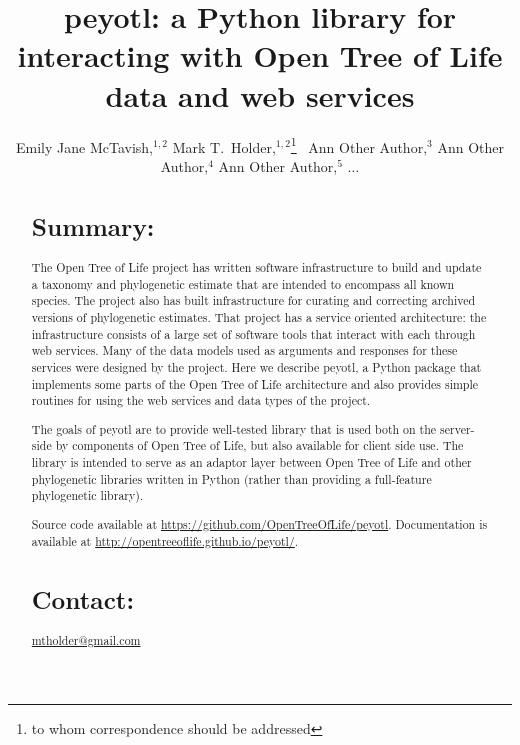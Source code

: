 \documentclass{bioinfo}
\newcommand{\pey}{peyotl\xspace}
\newcommand{\otol}{Open Tree of Life\xspace}
\begin{document}
\title[peyotl python package]{peyotl: a Python library for interacting with Open Tree of Life data and web services}

\author[McTavish\textit{et~al}]{
    Emily Jane McTavish,$^{1,2}$
    Mark T.~Holder,$^{1,2}$\footnote{to whom correspondence should be addressed}~
    Ann Other Author,$^{3}$
    Ann Other Author,$^{4}$
    Ann Other Author,$^{5}$ $\ldots$
}
\address{$^{1}$Department of Ecology and Evolutionary Biology, University of Kansas, Lawrence KS, USA\\
$^{2}$Heidelberg Institute of Theoretical Studies, Heidelberg, Germany}



\maketitle

\begin{abstract}
\section{Summary:}
The Open Tree of Life project has written software infrastructure
to build and update a taxonomy and phylogenetic estimate that 
are intended to encompass all known species.
The project also has built infrastructure for curating and correcting
    archived versions of phylogenetic estimates.
That project has a service oriented architecture: the infrastructure consists of
    a large set of software tools that interact with each through web services.
Many of the data models used as arguments and responses for these services were designed
    by the project.
Here we describe \pey, a Python package that implements some parts of
    the \otol architecture and also provides simple routines for 
    using the web services and data types of the project.

The goals of \pey are to provide well-tested library that is used
    both on the server-side by components of \otol, but also
    available for client side use.
The library is intended to serve as an adaptor layer between \otol
    and other phylogenetic libraries written in Python (rather 
    than providing a full-feature phylogenetic library).

Source code available at \url{https://github.com/OpenTreeOfLife/peyotl}.
Documentation is available at \url{http://opentreeoflife.github.io/peyotl/}.
\section{Contact:} \href{mailto:mtholder@gmail.com}{mtholder@gmail.com}
\end{abstract}
\end{document}
